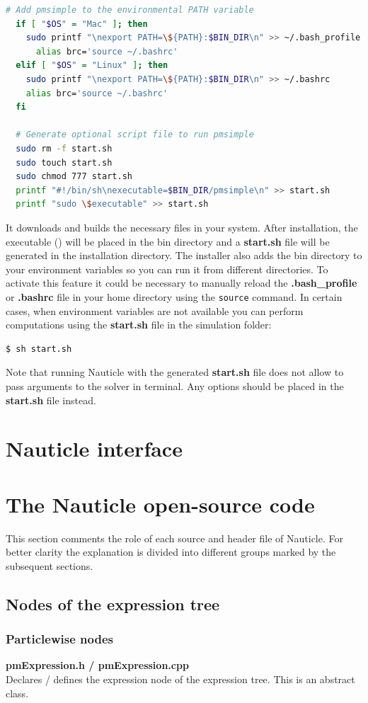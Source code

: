 \documentclass[a4paper,12pt,openany]{book}
\theoremstyle{break}
\begin{document}
\begin{example}{\installer{}}{}
\begin{lstlisting}[language=bash]
  # Add pmsimple to the environmental PATH variable
  if [ "$OS" = "Mac" ]; then
    sudo printf "\nexport PATH=\${PATH}:$BIN_DIR\n" >> ~/.bash_profile
      alias brc='source ~/.bashrc'
  elif [ "$OS" = "Linux" ]; then
    sudo printf "\nexport PATH=\${PATH}:$BIN_DIR\n" >> ~/.bashrc
    alias brc='source ~/.bashrc'
  fi

  # Generate optional script file to run pmsimple 
  sudo rm -f start.sh
  sudo touch start.sh
  sudo chmod 777 start.sh
  printf "#!/bin/sh\nexecutable=$BIN_DIR/pmsimple\n" >> start.sh
  printf "sudo \$executable" >> start.sh
\end{lstlisting}
\end{example}

It downloads and builds the necessary files in your system. After installation, the executable (\execname{}) will be placed in the bin directory and a \textbf{start.sh} file will be generated in the installation directory. The installer also adds the bin directory to your environment variables so you can run it from different directories. To activate this feature it could be necessary to manually reload the \textbf{.bash\_profile} or \textbf{.bashrc} file in your home directory using the \texttt{source} command.
In certain cases, when environment variables are not available you can perform computations using the \textbf{start.sh} file in the simulation folder:
\begin{lstlisting}[language=bash]
  $ sh start.sh
\end{lstlisting}
Note that running Nauticle with the generated \textbf{start.sh} file does not allow to pass arguments to the solver in terminal. Any options should be placed in the \textbf{start.sh} file instead.


\section{Nauticle interface} \label{sec:interface}
\section{The Nauticle open-source code}
This section comments the role of each source and header file of Nauticle. For better clarity the explanation is divided into different groups marked by the subsequent sections.
\subsection{Nodes of the expression tree}
\subsubsection{Particlewise nodes}
\textbf{pmExpression.h / pmExpression.cpp} \\
Declares / defines the expression node of the expression tree. This is an abstract class. \\
\end{document}
